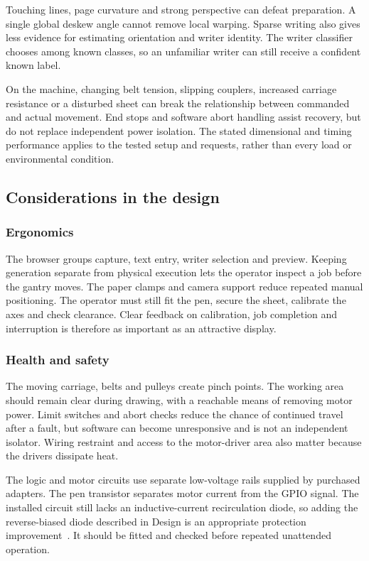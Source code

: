 Touching lines, page curvature and strong perspective can defeat preparation. A single global deskew angle cannot remove local warping. Sparse writing also gives less evidence for estimating orientation and writer identity. The writer classifier chooses among known classes, so an unfamiliar writer can still receive a confident known label.

On the machine, changing belt tension, slipping couplers, increased carriage resistance or a disturbed sheet can break the relationship between commanded and actual movement. End stops and software abort handling assist recovery, but do not replace independent power isolation. The stated dimensional and timing performance applies to the tested setup and requests, rather than every load or environmental condition.

\subsection{Considerations in the design}
\label{sec:dis-considerations}
\subsubsection{Ergonomics}
The browser groups capture, text entry, writer selection and preview. Keeping generation separate from physical execution lets the operator inspect a job before the gantry moves. The paper clamps and camera support reduce repeated manual positioning. The operator must still fit the pen, secure the sheet, calibrate the axes and check clearance. Clear feedback on calibration, job completion and interruption is therefore as important as an attractive display.

\subsubsection{Health and safety}
The moving carriage, belts and pulleys create pinch points. The working area should remain clear during drawing, with a reachable means of removing motor power. Limit switches and abort checks reduce the chance of continued travel after a fault, but software can become unresponsive and is not an independent isolator. Wiring restraint and access to the motor-driver area also matter because the drivers dissipate heat.

The logic and motor circuits use separate low-voltage rails supplied by purchased adapters. The pen transistor separates motor current from the GPIO signal. The installed circuit still lacks an inductive-current recirculation diode, so adding the reverse-biased diode described in Design is an appropriate protection improvement~\cite{rohmlowside2026}. It should be fitted and checked before repeated unattended operation.

